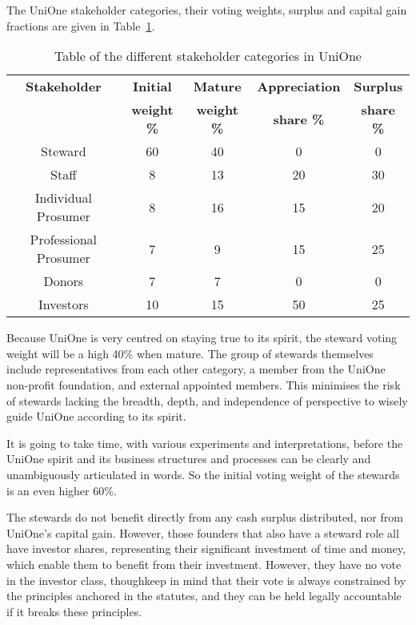 The UniOne stakeholder categories, their voting weights, surplus and capital gain fractions are given in Table~\ref{table:unione-stakeholders}.
\begin{table}[htbp]
\centering  
\begin{tabular}{ c  c  c  c  c  }
\toprule
\textbf{Stakeholder} & \textbf{Initial } & \textbf{Mature }& \textbf{Appreciation }& \textbf{Surplus} \\
\textbf{} & \textbf{weight \%} & \textbf{weight \%}& \textbf{share \%}& \textbf{share \%} \\
        \midrule
 Steward & 60 & 40 & 0 & 0 \\
 Staff & 8 & 13 & 20 & 30 \\
 Individual Prosumer & 8 & 16 & 15 & 20 \\
 Professional Prosumer & 7 & 9 & 15 & 25 \\
 Donors & 7 & 7 & 0 & 0 \\
 Investors & 10 & 15 & 50 & 25 \\
\bottomrule
\end{tabular}
\caption[Stakeholder categories in UniOne]{Table of the different stakeholder categories in UniOne}
\label{table:unione-stakeholders}
\end{table}


Because UniOne is very centred on staying true to its spirit, the steward voting weight will be a high 40\% when mature. The group of stewards themselves include representatives from each other category, a member from the UniOne non-profit foundation, and external appointed members. This minimises the risk of stewards lacking the breadth, depth, and independence of perspective to wisely guide UniOne according to its spirit.


It is going to take time, with various experiments and interpretations, before the UniOne spirit and its business structures and processes can be clearly and unambiguously articulated in words. So the initial voting weight of the stewards is an even higher 60\%.


The stewards do not benefit directly from any cash surplus distributed, nor from UniOne’s capital gain. However, those founders that also have a steward role all have investor shares, representing their significant investment of time and money, which enable them to benefit from their investment. However, they have no vote in the investor class, though\textemdash keep in mind that their vote is always constrained by the principles anchored in the statutes, and they can be held legally accountable if it breaks these principles.


